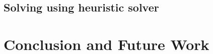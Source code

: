 \documentclass[11pt]{article}
\begin{document}
\subsection{Solving using heuristic solver}




\section{Conclusion and Future Work}





\end{document}
